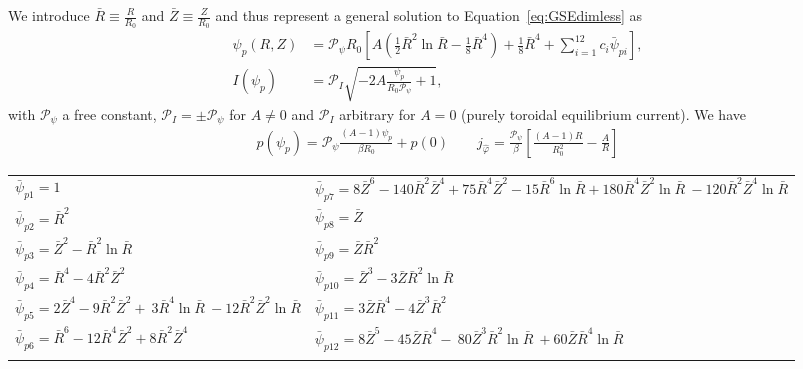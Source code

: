 We introduce \(\bar{R} \equiv \frac{R}{R_0}\) and \(\bar{Z} \equiv\frac{Z}{R_0}\)
and thus represent a general solution to Equation~\eqref{eq:GSEdimless} as~\cite{Cerfon2010}
\begin{subequations}
\label{eq:solovev}
\begin{align}
 \psi_p (R,Z) &= \mathcal P_{\psi} R_0 \left[ A\left( \frac{1}{2} \bar{R}^2 \ln{\bar{R}}
   - \frac{1}{8}\bar{R}^4\right)+ \frac{1}{8}\bar{R}^4
   + \sum_{i=1}^{12} c_{i}  \bar{\psi}_{pi}\right],\\
   I(\psi_p) &= \mathcal P_I\sqrt{ - 2A\frac{\psi_p}{R_0\mathcal P_{\psi}} +1},
\end{align}
\end{subequations}
with $\mathcal P_\psi$ a free constant, $\mathcal P_I = \pm \mathcal P_\psi$ for $A\neq 0$ and $\mathcal P_I$ arbitrary for $A=0$ (purely toroidal equilibrium current).
We have
\begin{align}
    p(\psi_p) = \mathcal P_\psi \frac{( A-1)\psi_p}{\beta R_0 } + p(0) \qquad
    j_{\hat\varphi} = \frac{\mathcal P_\psi}{\beta } \left[\frac{(A-1)R}{R_0^2} - \frac{A}{R}\right]
\end{align}
\begin{longtable}{>{\RaggedRight}p{7cm}>{\RaggedRight}p{7cm}}
\toprule
  $\bar{\psi}_{p1}=1$
  & $\bar{\psi}_{p7}=8\bar{Z}^6 -140 \bar{R}^2 \bar{Z}^4
                      + 75 \bar{R}^4 \bar{Z}^2 - 15\bar{R}^6\ln{\bar{R}}+ 180 \bar{R}^4 \bar{Z}^2 \ln{\bar{R}} \
                       -120 \bar{R}^2 \bar{Z}^4 \ln{\bar{R}}$\\
%
  $\bar{\psi}_{p2}=\bar{R}^2$ &
  $\bar{\psi}_{p8}=\bar{Z}$ \\
%
  $\bar{\psi}_{p3}=\bar{Z}^2 - \bar{R}^2 \ln{\bar{R}}$ &
  $\bar{\psi}_{p9}=\bar{Z}  \bar{R}^2$\\
%
  $\bar{\psi}_{p4}=\bar{R}^4 -4\bar{R}^2\bar{Z}^2$ &
  $\bar{\psi}_{p10}=\bar{Z}^3 - 3 \bar{Z} \bar{R}^2 \ln{\bar{R}}$\\
  $\bar{\psi}_{p5}=2\bar{Z}^4 - 9 \bar{R}^2\bar{Z}^2 + \
                     3 \bar{R}^4 \ln{\bar{R}} \
                    -12  \bar{R}^2\bar{Z}^2 \ln{\bar{R}}$
  &
$\bar{\psi}_{p11}=3 \bar{Z}\bar{R}^4 - 4\bar{Z}^3\bar{R}^2$\\
%
  $\bar{\psi}_{p6}=\bar{R}^6 -12 \bar{R}^4 \bar{Z}^2
                     + 8  \bar{R}^2 \bar{Z}^4$ &
  $\bar{\psi}_{p12}= 8 \bar{Z}^5 -45 \bar{Z} \bar{R}^4 - \
                       80 \bar{Z}^3 \bar{R}^2\ln{\bar{R}} \
                       +60 \bar{Z} \bar{R}^4\ln{\bar{R}}$ \\
   & \\
\bottomrule
\end{longtable}


